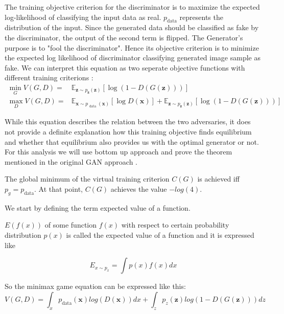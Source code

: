 The training objective criterion for the discriminator is to maximize the expected log-likelihood of
classifying the input data as real. $p_{\text{data}}$ represents the distribution of the input.
Since the generated data should be classified as fake by the discriminator, the output of the second
term is flipped. The Generator's purpose is to "fool the discriminator". Hence its objective criterion
is to minimize the expected log likelihood of discriminator classifying generated image sample as
fake. We can interpret this equation as two seperate objective functions with different training
criterions :
\begin{align}
    \min _{G} V(G, D)=& \mathbb{E}_{\boldsymbol{z} \sim p_{\boldsymbol{z}}(\boldsymbol{z})}[\log (1-D(G(\boldsymbol{z})))] \\[5pt]
    \max _{D} V(G, D)=& \mathbb{E}_{\boldsymbol{x} \sim p_{\text { data }}(\boldsymbol{x})}[\log D(\boldsymbol{x})]+\mathbb{E}_{\boldsymbol{z} \sim p_{\boldsymbol{z}}(\boldsymbol{z})}[\log (1-D(G(\boldsymbol{z})))]
\end{align}


While this equation describes the relation between the two adversaries, it does not provide a
definite explanation how this training objective finds equilibrium and whether that equilibrium also
provides us with the optimal generator or not. For this analysis we will use bottom up approach and
prove the theorem mentioned in the original GAN approach \cite{Goodfellow:2014:GAN:2969033.2969125}.

\begin{theorem}
\label{thr:gan}
The global minimum of the virtual training criterion $C(G)$ is achieved iff $p_g = p_{\text{data}}$.
At that point, $C(G)$ achieves the value $-log(4)$.
\end{theorem} 

We start by defining the term expected value of a function. 

\begin{definition}
    $E(f(x))$ of some function $f(x)$ with respect to  certain probability distribution
$p(x)$ is called the expected value of a function and it is expressed like 
\end{definition}
 
\begin{equation}
    \label{eqn:ev}
    E_{x \sim p_x} = \int p(x) f(x) dx
\end{equation}


So the minimax game equation can be expressed like this: 
\begin{equation}
    \label{eqn:minmax_gan}
    V( G, D) = \int_x p_{\text{data}}(\boldsymbol{x}) log(D(\boldsymbol{x})) dx + \int_z p_z(\boldsymbol{z}) log(1 - D(G(\boldsymbol{z}))) dz
\end{equation}
    

